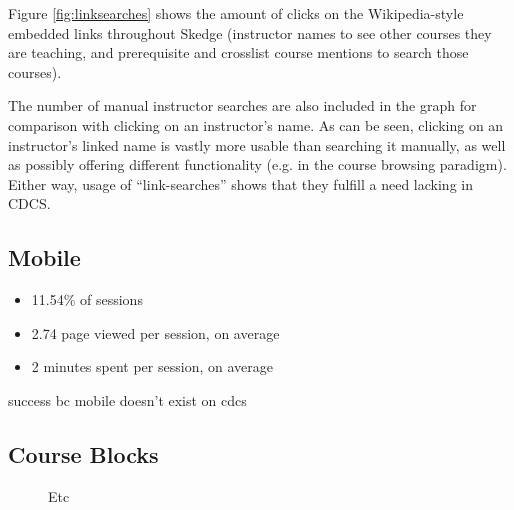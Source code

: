 Figure \ref{fig:linksearches} shows the amount of clicks on the Wikipedia-style embedded links throughout Skedge (instructor names to see other courses they are teaching, and prerequisite and crosslist course mentions to search those courses).

The number of manual instructor searches are also included in the graph for comparison with clicking on an instructor's name. As can be seen, clicking on an instructor's linked name is vastly more usable than searching it manually, as well as possibly offering different functionality (e.g. in the course browsing paradigm). Either way, usage of ``link-searches'' shows that they fulfill a need lacking in CDCS.

\subsection{Mobile}

\begin{itemize}
  \item 11.54\% of sessions
  \item 2.74 page viewed per session, on average
  \item 2 minutes spent per session, on average
\end{itemize}

success bc mobile doesn't exist on cdcs

\subsection{Course Blocks}

\begin{figure}
  \centering


  \caption{Etc}
  \label{fig:searchtypes}

\end{figure}

